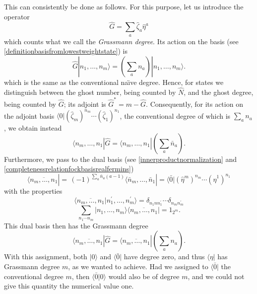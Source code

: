 \documentclass[a4paper,10pt]{article}
\begin{document}
This can consistently be done as follows. For this purpose, let us introduce the operator
\begin{equation}
\hat{G}=\sum_a\hat{\zeta}_a\hat{\eta}^a
\end{equation}
which counts what we call the \emph{Grassmann degree}. Its action on the basis (see 
\eqref{definitionbasisfromlowestweightstate}) is 
\begin{equation}
\hat{G}|n_1,\ldots,n_m\rangle=(\sum_an_a)|n_1,\ldots,n_m\rangle.
\end{equation}
which is the same as the conventional na\"\i ve degree. Hence, for states we distinguish 
between the ghost number, being counted by $\hat{N}$, and the ghost degree, being counted 
by $\hat{G}$; its adjoint is $\hat{G}^{\ast}=m-\hat{G}$. Consequently, for its action on 
the adjoint basis  $\langle0|(\hat{\zeta}_m)^{n_m}\cdots(\hat{\zeta}_1)^{n_1}$, the 
conventional degree of which is $\sum_an_a$, we obtain instead 
$$\langle n_m,\ldots,n_1|\hat{G}=\langle n_m,\ldots,n_1|(\sum_a\bar{n}_a).$$
Furthermore, we pass to the dual basis (see \eqref{innerproductnormalization} and 
\eqref{completenessrelationfockbasisrealfermins})
\begin{equation}
\langle\overline{n_m,\ldots,n_1}|=\,(-1)^{\sum_{a}\bar{n}_a(a-
1)}\langle\bar{n}_m,\ldots,\bar{n}_1|=\langle\bar{0}|(\hat{\eta}^m)^{n_m}\cdots
(\hat{\eta}^1)^{n_1}
\end{equation}
with the properties 
\begin{equation}
\langle\overline{n_m,\ldots,n_1}|n^{\prime}_1,\ldots,n^{\prime}_m\rangle=\delta_
{n_1nn^{\prime}_1}\cdots\delta_{n_mn^{\prime}_m}
\end{equation}
\begin{equation}
\sum_{n_1\cdots n_m}|n_1,\ldots,n_m\rangle\langle\overline{n_m,\ldots,n_1}|=1_{2^m}.
\end{equation}
This dual basis then has the Grassmann degree
\begin{equation}
\langle\overline{n_m,\ldots,n_1}|\hat{G}=\langle\overline{n_m,\ldots,n_1}|
(\sum_an_a).
\end{equation}
With this assignment, both $|0\rangle$ and $\langle\bar{0}|$ have degree zero, and thus 
$\langle\eta|$ has Grassmann degree $m$, as we wanted to achieve. Had we assigned  to 
$\langle\bar{0}|$ the conventional degree $m$, then $\langle\bar{0}|0\rangle$ would also 
be of degree $m$, and we could not give this quantity the numerical value one.
\end{document}

